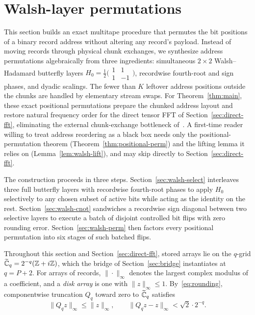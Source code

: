 \section{Walsh-layer permutations}\label{sec:walsh}

This section builds an exact multitape procedure that permutes the bit positions of a binary record address without
altering any record's payload. Instead of moving records through physical chunk exchanges, we synthesize address
permutations algebraically from three ingredients: simultaneous $2\times 2$ Walsh--Hadamard butterfly layers
$H_0=\frac12\bigl(\begin{smallmatrix}1&1\\1&-1\end{smallmatrix}\bigr)$, recordwise fourth-root and sign phases, and
dyadic scalings. The fewer than $K$ leftover address positions outside the chunks are handled by elementary stream swaps.
For Theorem~\ref{thm:main}, these exact positional permutations prepare the chunked address layout and restore natural
frequency order for the direct tensor FFT of Section~\ref{sec:direct-fft}, eliminating the external chunk-exchange
bottleneck of~\cite{OAI26}. A first-time reader willing to treat address reordering as a black box needs only the
positional-permutation theorem (Theorem~\ref{thm:positional-perm}) and the lifting lemma it relies on
(Lemma~\ref{lem:walsh-lift}), and may skip directly to Section~\ref{sec:direct-fft}.

The construction proceeds in three steps. Section~\ref{sec:walsh-select} interleaves three full butterfly layers with
recordwise fourth-root phases to apply $H_0$ selectively to any chosen subset of active bits while acting as the identity
on the rest. Section~\ref{sec:walsh-cnot} sandwiches a recordwise sign diagonal between two selective layers to execute a
batch of disjoint controlled bit flips with zero rounding error. Section~\ref{sec:walsh-perm} then factors every
positional permutation into six stages of such batched flips.

Throughout this section and Section~\ref{sec:direct-fft}, stored arrays lie on the $q$-grid
$\widetilde{\mathbb{C}}_q=2^{-q}(\mathbb{Z}+i\mathbb{Z})$, which the bridge of Section~\ref{sec:bridge} instantiates at $q=P+2$. For arrays of records,
$\|\cdot\|_\infty$ denotes the largest complex modulus of a coefficient, and a \emph{disk array} is one with
$\|z\|_\infty\le1$. By~\eqref{eq:rounding}, componentwise truncation $Q_q$ toward zero to $\widetilde{\mathbb{C}}_q$ satisfies
\begin{equation}\label{eq:walsh-truncation}
  \|Q_qz\|_\infty\le\|z\|_\infty,\qquad \|Q_qz-z\|_\infty<\sqrt2\cdot2^{-q}.
\end{equation}

